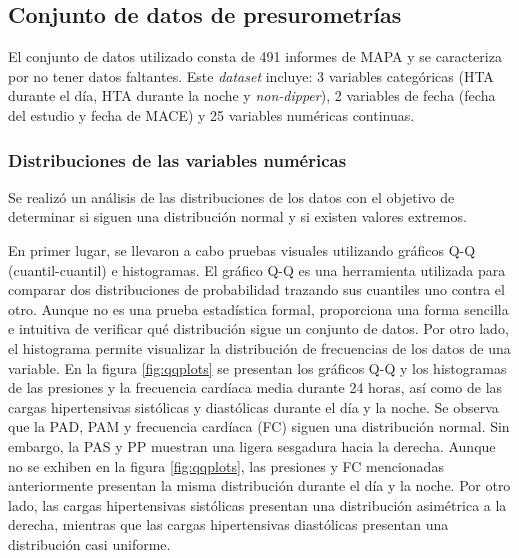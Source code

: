 \subsection{Conjunto de datos de presurometrías}
\label{sec:Conjunto1}

El conjunto de datos utilizado consta de 491 informes de MAPA y se caracteriza por no tener datos faltantes. 
Este \emph{dataset} incluye: 3 variables categóricas (HTA durante el día, HTA durante la noche y \emph{non-dipper}), 
2 variables de fecha (fecha del estudio y fecha de MACE) y 25 variables numéricas continuas.


\subsubsection{Distribuciones de las variables numéricas}
Se realizó un análisis de las distribuciones de los datos con el objetivo de determinar si siguen una distribución 
normal y si existen valores extremos. 

En primer lugar, se llevaron a cabo pruebas visuales utilizando gráficos Q-Q 
(cuantil-cuantil) e histogramas. El gráfico Q-Q es una herramienta utilizada para comparar dos distribuciones de 
probabilidad trazando sus cuantiles uno contra el otro. Aunque no es una prueba estadística formal, proporciona 
una forma sencilla e intuitiva de verificar qué distribución sigue un conjunto de datos. Por otro lado, el 
histograma permite visualizar la distribución de frecuencias de los datos de una variable. En la figura \ref{fig:qqplots} 
se presentan los gráficos Q-Q y los histogramas de las presiones y la frecuencia cardíaca media durante 24 horas, 
así como de las cargas hipertensivas sistólicas y diastólicas durante el día y la noche. Se observa que la PAD, 
PAM y frecuencia cardíaca (FC) siguen una distribución normal. Sin embargo, la PAS y PP muestran una 
ligera sesgadura hacia la derecha. Aunque no se exhiben en la figura \ref{fig:qqplots}, las presiones y FC 
mencionadas anteriormente presentan la misma distribución durante el día y la noche. 
Por otro lado, las cargas hipertensivas sistólicas presentan una distribución asimétrica a la derecha, 
mientras que las cargas hipertensivas diastólicas presentan una distribución casi uniforme.

